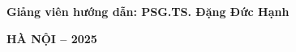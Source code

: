 \hspace*{8mm}\setfontsize{14pt}\textbf{Giảng viên hướng dẫn: PSG.TS.
	Đặng Đức Hạnh}\\[0.8cm]

\begin{center}
	\vfill
	\setfontsize{12pt}\textbf{HÀ NỘI – 2025}
\end{center}




